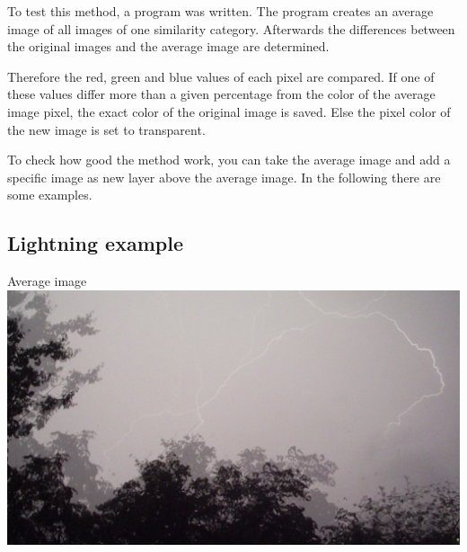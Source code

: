 \documentclass[10pt,a4paper,parskip=full]{scrartcl}
\begin{document}
	To test this method, a program was written. The program creates an average image of all images of one similarity category. Afterwards the differences between the original images and the average image are determined.
	
	Therefore the red, green and blue values of each pixel are compared. If one of these values differ more than a given percentage from the color of the average image pixel, the exact color of the original image is saved. Else the pixel color of the new image is set to transparent.
	
	To check how good the method work, you can take the average image and add a specific image as new layer above the average image. In the following there are some examples.
	\newpage
	
	\subsection{Lightning example}
	\centering Average image\\
	\includegraphics[width=\linewidth]{lightning_average}
	\newpage
\end{document}
